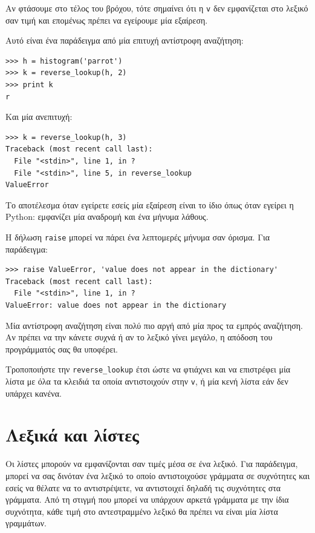 \documentclass[10pt]{book}
\begin{document}
Αν φτάσουμε στο τέλος του βρόχου, τότε σημαίνει ότι η {\tt v} δεν εμφανίζεται στο λεξικό σαν τιμή και επομένως πρέπει να εγείρουμε μία εξαίρεση.

Αυτό είναι ένα παράδειγμα από μία επιτυχή αντίστροφη αναζήτηση:

\begin{verbatim}
>>> h = histogram('parrot')
>>> k = reverse_lookup(h, 2)
>>> print k
r
\end{verbatim}
%
Και μία ανεπιτυχή:

\begin{verbatim}
>>> k = reverse_lookup(h, 3)
Traceback (most recent call last):
  File "<stdin>", line 1, in ?
  File "<stdin>", line 5, in reverse_lookup
ValueError
\end{verbatim}
%
Το αποτέλεσμα όταν εγείρετε εσείς μία εξαίρεση είναι το ίδιο όπως όταν εγείρει η Python: εμφανίζει μία αναδρομή και ένα μήνυμα λάθους.

Η δήλωση {\tt raise} μπορεί να πάρει ένα λεπτομερές μήνυμα σαν όρισμα. Για παράδειγμα:

\begin{verbatim}
>>> raise ValueError, 'value does not appear in the dictionary'
Traceback (most recent call last):
  File "<stdin>", line 1, in ?
ValueError: value does not appear in the dictionary
\end{verbatim}
%
Μία αντίστροφη αναζήτηση είναι πολύ πιο αργή από μία προς τα εμπρός αναζήτηση. Αν πρέπει να την κάνετε συχνά ή αν το λεξικό γίνει μεγάλο, η απόδοση του προγράμματός σας θα υποφέρει.
\\
\begin{exercise}

Τροποποιήστε την \verb"reverse_lookup" έτσι ώστε να φτιάχνει και να επιστρέφει μία λίστα με όλα τα κλειδιά τα οποία αντιστοιχούν στην {\tt v}, ή μία κενή λίστα εάν δεν υπάρχει κανένα.
\end{exercise}


\section{Λεξικά και λίστες}
\label{invert}

Οι λίστες μπορούν να εμφανίζονται σαν τιμές μέσα σε ένα λεξικό. Για παράδειγμα, μπορεί να σας δινόταν ένα λεξικό το οποίο αντιστοιχούσε γράμματα σε συχνότητες και εσείς να θέλατε να το αντιστρέψετε, να αντιστοιχεί δηλαδή τις συχνότητες στα γράμματα. Από τη στιγμή που μπορεί να υπάρχουν αρκετά γράμματα με την ίδια συχνότητα, κάθε τιμή στο αντεστραμμένο λεξικό θα πρέπει να είναι μία λίστα γραμμάτων.
\end{document}
